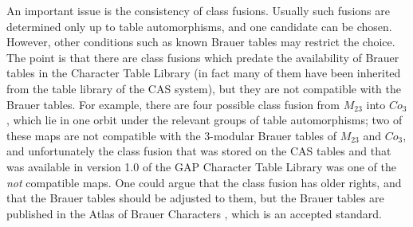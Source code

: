 \documentclass[a4paper,11pt]{report}
\begin{document}
{{ An important issue is the consistency of class fusions. Usually such fusions
are determined only up to table automorphisms, and one candidate can be
chosen. However, other conditions such as known Brauer tables may restrict the
choice. The point is that there are class fusions which predate the
availability of Brauer tables in the Character Table Library (in fact many of
them have been inherited from the table library of the \textsf{CAS} system), but they are not compatible with the Brauer tables. For example,
there are four possible class fusion from $M_{23}$ into $Co_3$, which lie in one orbit under the relevant groups of table automorphisms; two
of these maps are not compatible with the $3$-modular Brauer tables of $M_{23}$ and $Co_3$, and unfortunately the class fusion that was stored on the \textsf{CAS} tables {\textendash}and that was available in version 1.0 of the \textsf{GAP} Character Table Library{\textendash} was one of the \emph{not} compatible maps. One could argue that the class fusion has older rights, and
that the Brauer tables should be adjusted to them, but the Brauer tables are
published in the \textsf{Atlas} of Brauer Characters \cite{JLPW95}, which is an accepted standard. }

 }

    
\end{document}
